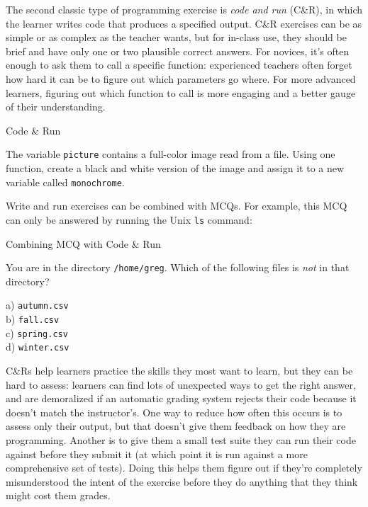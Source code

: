 The second classic type of programming exercise is \emph{code and run}
(C\&R), in which the learner writes code that produces a specified
output.  C\&R exercises can be as simple or as complex as the teacher
wants, but for in-class use, they should be brief and have only one or
two plausible correct answers. For novices, it's often enough to ask
them to call a specific function: experienced teachers often forget
how hard it can be to figure out which parameters go where.  For more
advanced learners, figuring out which function to call is more
engaging and a better gauge of their understanding.

\begin{callout}{Code \& Run}

  The variable \texttt{picture} contains a full-color image read from
  a file.  Using one function, create a black and white version of the
  image and assign it to a new variable called \texttt{monochrome}.

\end{callout}

\noindent
Write and run exercises can be combined with MCQs.  For example, this
MCQ can only be answered by running the Unix \texttt{ls} command:

\begin{callout}{Combining MCQ with Code \& Run}

  You are in the directory \texttt{/home/greg}. Which of the following
  files is \emph{not} in that directory?

  \noindent
  a) \texttt{autumn.csv} \\
  b) \texttt{fall.csv} \\
  c) \texttt{spring.csv} \\
  d) \texttt{winter.csv}

\end{callout}

C\&Rs help learners practice the skills they most want to learn, but
they can be hard to assess: learners can find lots of unexpected ways
to get the right answer, and are demoralized if an automatic grading
system rejects their code because it doesn't match the instructor's.
One way to reduce how often this occurs is to assess only their
output, but that doesn't give them feedback on how they are
programming.  Another is to give them a small test suite they can run
their code against before they submit it (at which point it is run
against a more comprehensive set of tests). Doing this helps them
figure out if they're completely misunderstood the intent of the
exercise before they do anything that they think might cost them
grades.

